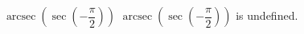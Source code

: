  {$\operatorname{arcsec}\left(\sec\left(-\dfrac{\pi}{2} \right) \right)$ }
{ $\operatorname{arcsec}\left(\sec\left(-\dfrac{\pi}{2} \right) \right)$ is undefined. }
